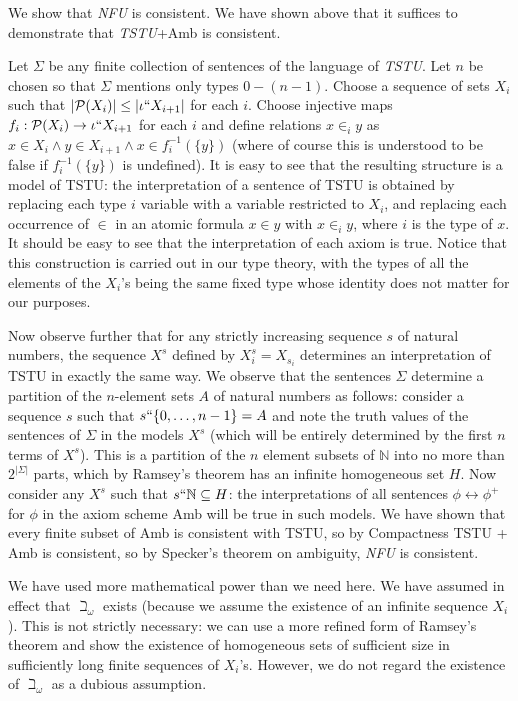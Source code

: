 \documentclass[12pt]{book}
\begin{document}
We show that {\em NFU\/} is consistent.  We have shown above that it suffices to demonstrate that {\em TSTU\/}+Amb is consistent.

Let $\Sigma$ be any finite collection of sentences of the language of {\em TSTU\/}.  Let $n$ be chosen so that $\Sigma$ mentions only types $0-(n-1)$.  Choose a sequence of sets
$X_i$ such that $|{\cal P}(X_i)| \leq |\iota``X_{i+1}|$ for each $i$.  Choose injective maps $f_i:{\cal P}(X_i) \rightarrow \iota``X_{i+1}$ for each $i$ and define relations
$x \in_i y$ as $x \in X_i \wedge y \in X_{i+1} \wedge x \in f_i^{-1}(\{y\})$  (where of course this is understood to be false if  $f_i^{-1}(\{y\})$ is undefined).  It is easy to see
that the resulting structure is a model of TSTU:  the interpretation of a sentence of TSTU is obtained by replacing each type $i$ variable with a variable restricted to $X_i$,
and replacing each occurrence of $\in$ in an atomic formula $x \in y$ with $x \in _i y$, where $i$ is the type of $x$.  It should be easy to see that the interpretation of each axiom is true.  Notice that this construction is carried out in our type theory,
with the types of all the elements of the $X_i$'s being the same fixed type whose identity does not matter for our purposes.

Now observe further that for any strictly increasing sequence $s$ of natural numbers, the sequence $X^s$ defined by $X^s_i = X_{s_i}$ determines an interpretation of TSTU in exactly the same way.
We observe that the sentences $\Sigma$ determine a partition of the $n$-element sets $A$ of natural numbers as follows:  consider a sequence $s$ such that $s``\{0,\ldots,n-1\}=A$ and note the truth values
of the sentences of $\Sigma$ in the models $X^s$ (which will be entirely determined by the first $n$ terms of $X^s$).  This is  a partition of the $n$ element subsets of $\mathbb N$ into no more than $2^{|\Sigma|}$ parts, which by Ramsey's theorem has
an infinite homogeneous set $H$.  Now consider any $X^s$ such that $s``{\mathbb N} \subseteq H$:  the interpretations of all sentences $\phi \leftrightarrow \phi^+$ for $\phi$ in the axiom scheme Amb will be true in such models.  We have shown that every finite subset of Amb is consistent with TSTU,
so by Compactness TSTU + Amb is consistent, so by Specker's theorem on ambiguity, {\em NFU\/} is consistent.

We have used more mathematical power than we need here.  We have assumed in effect that $\beth_{\omega}$ exists (because we assume the existence of an infinite sequence $X_i$).  This is not strictly necessary:  we can use a more refined form of Ramsey's theorem and
show the existence of homogeneous sets of sufficient size in sufficiently long finite sequences of $X_i$'s.  However, we do not regard the existence of $\beth_{\omega}$ as a dubious assumption.
\end{document}
